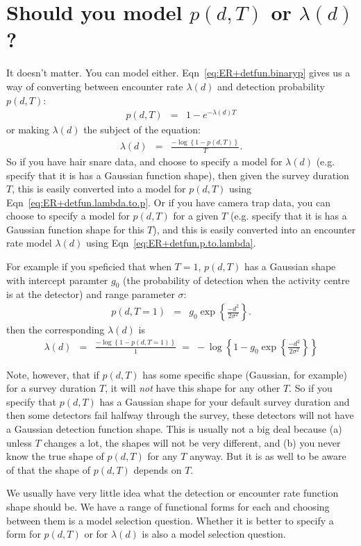 \documentclass[graybox,envcountchap,sectrefs]{SpringerStyleFiles/styles/svmono}\usepackage[]{graphicx}\usepackage[]{color}
\newcommand{\be}{\begin{eqnarray}}
\newcommand{\ee}{\end{eqnarray}}
\begin{document}
\section{Should you model $p(d,T)$ or $\lambda(d)$?}

It doesn't matter. You can model either. Eqn~\eqref{eq:ER+detfun.binaryp} gives us a way of converting between encounter rate $\lambda(d)$ and detection probability $p(d,T)$:
\be
p(d,T)&=&1-e^{-\lambda(d)T} 
\label{eq:ER+detfun.lambda.to.p}
\ee
\noindent
or making $\lambda(d)$ the subject of the equation:
\be
\lambda(d)&=&\frac{-\log\left\{1-p(d,T)\right\}}{T}.
\label{eq:ER+detfun.p.to.lambda}
\ee
So if you have hair snare data, and choose to specify a model for $\lambda(d)$ (e.g. specify that it is has a Gaussian function shape), then given the survey duration $T$, this is easily converted into a model for $p(d,T)$ using Eqn~\eqref{eq:ER+detfun.lambda.to.p}. Or if you have camera trap data, you can choose to specify a model for $p(d,T)$ for a given $T$ (e.g. specify that it is has a Gaussian function shape for this $T$), and this is easily converted into an encounter rate model $\lambda(d)$ using Eqn~\eqref{eq:ER+detfun.p.to.lambda}.

For example if you speficied that when $T=1$, $p(d,T)$ has a Gaussian shape with intercept paramter $g_0$ (the probability of detection when the activity centre is at the detector) and range parameter $\sigma$:
\be
p(d,T=1)&=&g_0\exp\left\{\frac{-d^2}{2\sigma^2}\right\}.
\label{eq:ER+detfun.p.hn}
\ee
\noindent
then the corresponding $\lambda(d)$ is
\be
\lambda(d)&=&\frac{-\log\left\{1-p(d,T=1)\right\}}{1}
\;=\;-\log\left\{1-g_0\exp\left\{\frac{-d^2}{2\sigma^2}\right\}\right\}
\label{eq:ER+detfun.Guassian.p.to.lambda}
\ee

Note, however, that if $p(d,T)$ has some specific shape (Gaussian, for example) for a survey duration $T$, it will \textit{not} have this shape for any other $T$. So if you specify that $p(d,T)$ has a Gaussian shape for your default survey duration and then some detectors fail halfway through the survey, these detectors will not have a Gaussian detection function shape. This is usually not a big deal because (a) unless $T$ changes a lot, the shapes will not be very different, and (b) you never know the true shape of $p(d,T)$ for any $T$ anyway. But it is as well to be aware of that the shape of $p(d,T)$ depends on $T$.

We usually have very little idea what the detection or encounter rate function shape should be. We have a range of functional forms for each and choosing between them is a model selection question. Whether it is better to specify a form for $p(d,T)$ or for $\lambda(d)$ is also a model selection question. 
\end{document}
